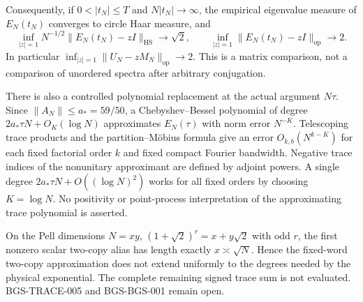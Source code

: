 Consequently, if $0<|t_N|\le T$ and $N|t_N|\to\infty$, the empirical
eigenvalue measure of $E_N(t_N)$ converges to circle Haar measure, and
\[
 \inf_{|z|=1}N^{-1/2}\|E_N(t_N)-zI\|_{\mathrm{HS}}\to\sqrt2,
 \qquad\inf_{|z|=1}\|E_N(t_N)-zI\|_{\mathrm{op}}\to2.
\]
In particular $\inf_{|z|=1}\|U_N-zM_N\|_{\mathrm{op}}\to2$.
This is a matrix comparison, not a comparison of unordered spectra
after arbitrary conjugation.

There is also a controlled polynomial replacement at the actual argument
$N\tau$. Since $\|A_N\|\le a_*=59/50$, a Chebyshev--Bessel polynomial
of degree $2a_*\tau N+O_K(\log N)$ approximates $E_N(\tau)$ with norm
error $N^{-K}$. Telescoping trace products and the partition--M\"obius
formula give an error $O_{k,b}(N^{k-K})$ for each fixed factorial order
$k$ and fixed compact Fourier bandwidth. Negative trace indices of the
nonunitary approximant are defined by adjoint powers. A single degree
$2a_*\tau N+O((\log N)^2)$ works for all fixed orders by choosing
$K=\log N$. No positivity or point-process interpretation of the
approximating trace polynomial is asserted.

On the Pell dimensions $N=xy$, $(1+\sqrt2)^r=x+y\sqrt2$ with odd $r$,
the first nonzero scalar two-copy alias has length exactly $x\asymp\sqrt N$.
Hence the fixed-word two-copy approximation does not extend uniformly
to the degrees needed by the physical exponential. The complete remaining
signed trace sum is not evaluated. BGS-TRACE-005 and BGS-BGS-001 remain open.
